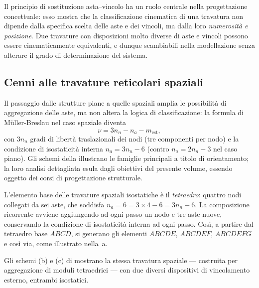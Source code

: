\begin{oss}
	Il principio di sostituzione asta--vincolo
	ha un ruolo centrale nella progettazione
	concettuale: esso mostra che la classificazione
	cinematica di una travatura non dipende dalla
	specifica scelta delle aste e dei vincoli, ma
	dalla loro \emph{numerosità e posizione}. Due
	travature con disposizioni molto diverse di
	aste e vincoli possono essere cinematicamente
	equivalenti, e dunque scambiabili nella
	modellazione senza alterare il grado di
	determinazione del sistema.
\end{oss}



\subsection{Cenni alle travature reticolari spaziali}
\label{subsec:reticolari_spaziali}

Il passaggio dalle strutture piane a quelle spaziali
amplia le possibilità di aggregazione delle aste,
ma non altera la logica di classificazione: la
formula di M\"{u}ller-Breslau nel caso spaziale diventa
\begin{equation}\label{eq:muller_breslau_spaz}
	\nu = 3n_n - n_a - m_{\text{est}},
\end{equation}
con $3n_n$ gradi di libertà traslazionali dei nodi
(tre componenti per nodo) e la condizione di
isostaticità interna $n_a = 3n_n - 6$ (contro
$n_a = 2n_n - 3$ nel caso piano). Gli schemi della  illustrano
le famiglie principali a titolo di orientamento;
la loro analisi dettagliata esula dagli obiettivi
del presente volume, essendo oggetto dei corsi
di progettazione strutturale.

L'elemento base delle travature spaziali isostatiche
è il \emph{tetraedro}: quattro nodi collegati da
sei aste, che soddisfa $n_a = 6 = 3 \times 4 - 6
= 3n_n - 6$. La composizione ricorrente avviene
aggiungendo ad ogni passo un nodo e tre aste nuove,
conservando la condizione di isostaticità interna
ad ogni passo. Così, a partire dal tetraedro base
$ABCD$, si generano gli elementi $ABCDE$,
$ABCDEF$, $ABCDEFG$ e così via, come illustrato
nella \,a.


Gli schemi (b) e (c) di 
mostrano la stessa travatura spaziale --- costruita
per aggregazione di moduli tetraedrici ---
con due diversi dispositivi di vincolamento
esterno, entrambi isostatici.

